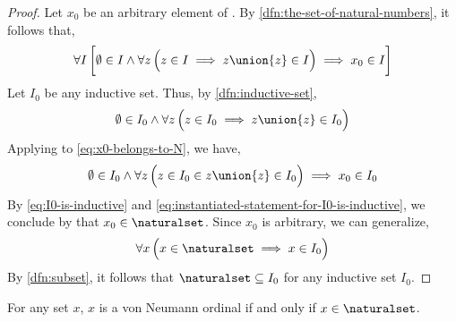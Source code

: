 \begin{proof}
    Let \( x_{0} \) be an arbitrary element of \naturalset.
    By \cref{dfn:the-set-of-natural-numbers}, it follows that,
    \begin{equation}
        \label{eq:x0-belongs-to-N}
        \forall I \, \bigg[ \emptyset \in I \land \forall z \, \Big( z \in I \implies z \union \mleft\{ z \mright\} \in I \Big) \implies x_{0} \in I \bigg]
    \end{equation}
    Let \( I_{0} \) be any inductive set. Thus, by \cref{dfn:inductive-set},
    \begin{equation}
        \label{eq:I0-is-inductive}
        \emptyset \in I_{0} \land \forall z \, \Big( z \in I_{0} \implies z \union \mleft\{ z \mright\} \in I_{0} \Big)
    \end{equation}
    Applying  to \eqref{eq:x0-belongs-to-N}, we have,
    \begin{equation}
        \label{eq:instantiated-statement-for-I0-is-inductive}
        \emptyset \in I_{0} \land \forall z \, \Big( z \in I_{0} \in z \union \mleft\{ z \mright\} \in I_{0} \Big) \implies x_{0} \in I_{0}
    \end{equation}
    By \eqref{eq:I0-is-inductive} and \eqref{eq:instantiated-statement-for-I0-is-inductive}, we conclude by  that \( x_{0} \in \naturalset \).
    Since \( x_{0} \) is arbitrary, we can generalize,
    \begin{equation*}
        \forall x \, \Big( x \in \naturalset \implies x \in I_{0} \Big)
    \end{equation*}
    By \cref{dfn:subset}, it follows that \( \naturalset \subseteq I_{0} \) for any inductive set \( I_{0} \).
\end{proof}

\begin{thm}
    \label{thm:the-set-of-all-natural-numbers-contains-exactly-the-von-Neumann-ordinals}
    For any set \( x \), \( x \) is a von Neumann ordinal if and only if \( x \in \naturalset \).
\end{thm}

